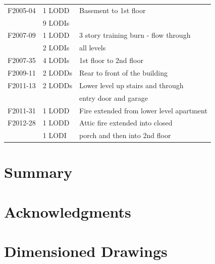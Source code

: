 \documentclass[12pt,oneside]{book}
\begin{document}
\begin{table}[!ht]
\begin{tabular}{lll}
F2005-04 \cite{NIOSH:McFall4}       &  1 LODD             &  Basement to 1st floor                     \\
                                    &  9 LODIs            &                                            \\
F2007-09 \cite{NIOSH:Tarley}        &  1 LODD             &  3 story training burn - flow through      \\
                                    &  2 LODIs            &  all levels                                \\
F2007-35 \cite{NIOSH:Braddee}       &  4 LODIs            &  1st floor to 2nd floor                    \\
F2009-11 \cite{NIOSH:Merinar}       &  2 LODDs            &  Rear to front of the building             \\
F2011-13 \cite{NIOSH:Bowyer2}       &  2 LODDs            &  Lower level up stairs and through         \\
                                    &                     &  entry door and garage                     \\
F2011-31 \cite{NIOSH:Loflin}        &  1 LODD             &  Fire extended from lower level apartment  \\
F2012-28 \cite{NIOSH:Bowyer}        &  1 LODD             &  Attic fire extended into closed           \\
                                    &  1 LODI             &  porch and then into 2nd floor             \\
\bottomrule
\end{tabular}
\label{tab:LODD}
\end{table}

\clearpage

\chapter{Summary}

\chapter{Acknowledgments}



\appendix

\chapter{Dimensioned Drawings}
\label{app_draw}
\end{document}
